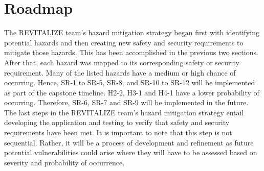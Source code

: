 \documentclass{article}
\begin{document}
\section{Roadmap}
The REVITALIZE team's hazard mitigation strategy began first with identifying potential hazards and then creating new safety and security requirements to mitigate those hazards. This has been accomplished in the previous two sections. After that, each hazard was mapped to its corresponding safety or security requirement. Many of the listed hazards have a medium or high chance of occurring. Hence, SR-1 to SR-5, SR-8, and SR-10 to SR-12 will be implemented as part of the capstone timeline. H2-2, H3-1 and H4-1 have a lower probability of occurring. Therefore, SR-6, SR-7 and SR-9 will be implemented in the future. The last steps in the REVITALIZE team's hazard mitigation strategy entail developing the application and testing to verify that safety and security requirements have been met. It is important to note that this step is not sequential. Rather, it will be a process of development and refinement as future potential vulnerabilities could arise where they will have to be assessed based on severity and probability of occurrence.
\end{document}
